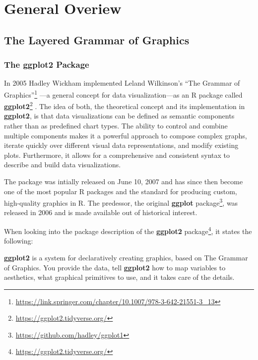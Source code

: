 \documentclass[
]{krantz}
\renewenvironment{quote}{\begin{VF}}{\end{VF}}
\renewcommand{\href}[2]{#2\footnote{\url{#1}}}
\begin{document}
\hypertarget{part-general-overiew}{%
\part{General Overiew}\label{part-general-overiew}}

\hypertarget{grammar}{%
\chapter{The Layered Grammar of Graphics}\label{grammar}}

\hypertarget{ggplot}{%
\section{The ggplot2 Package}\label{ggplot}}

In 2005 Hadley Wickham implemented Leland Wilkinson's \href{https://link.springer.com/chapter/10.1007/978-3-642-21551-3_13}{``The Grammar of Graphics''} \citep{wilkinson2005}---a general concept for data visualization---as an R package called \href{https://ggplot2.tidyverse.org/}{\textbf{ggplot2}} \citep{ggplot2}. The idea of both, the theoretical concept and its implementation in \textbf{ggplot2}, is that data visualizations can be defined as semantic components rather than as predefined chart types. The ability to control and combine multiple components makes it a powerful approach to compose complex graphs, iterate quickly over different visual data representations, and modify existing plots. Furthermore, it allows for a comprehensive and consistent syntax to describe and build data visualizations.

The package was intially released on June 10, 2007 and has since then become one of the most popular R packages and the standard for producing custom, high-quality graphics in R. The predessor, the original \href{https://github.com/hadley/ggplot1}{\textbf{ggplot} package}, was released in 2006 and is made available out of historical interest.

When looking into the package description of the \href{https://ggplot2.tidyverse.org/}{\textbf{ggplot2} package}, it states the following:

\begin{quote}
\textbf{ggplot2} is a system for declaratively creating graphics, based on The Grammar of Graphics. You provide the data, tell \textbf{ggplot2} how to map variables to aesthetics, what graphical primitives to use, and it takes care of the details.
\end{quote}
\end{document}
